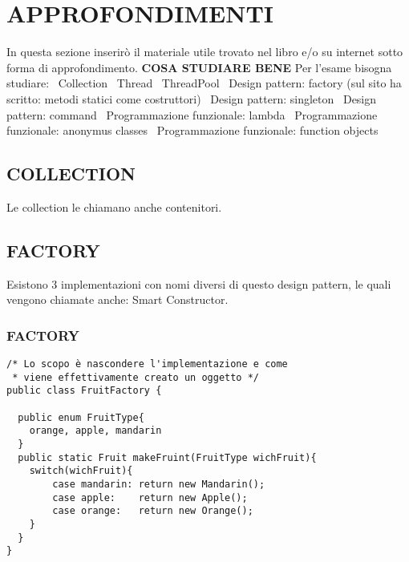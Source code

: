 

\newpage
\section{APPROFONDIMENTI}
In questa sezione inserirò il materiale utile trovato nel libro e/o su internet sotto forma di approfondimento. \newline
\noindent \textbf{COSA STUDIARE BENE} \newline
Per l'esame bisogna studiare: \newline
\textbullet\ Collection \newline
\textbullet\ Thread \newline
\textbullet\ ThreadPool \newline
\textbullet\ Design pattern: factory (sul sito ha scritto: metodi statici come costruttori)\newline
\textbullet\ Design pattern: singleton \newline
\textbullet\ Design pattern: command \newline
\textbullet\ Programmazione funzionale: lambda \newline
\textbullet\ Programmazione funzionale: anonymus classes \newline
\textbullet\ Programmazione funzionale: function objects \newline

\subsection{COLLECTION}
\noindent Le collection le chiamano anche contenitori.

\subsection{FACTORY}
Esistono 3 implementazioni con nomi diversi di questo design pattern, le quali vengono chiamate anche: Smart Constructor. \newline
\subsubsection{FACTORY}
\begin{lstlisting}
/* Lo scopo è nascondere l'implementazione e come
 * viene effettivamente creato un oggetto */
public class FruitFactory {

  public enum FruitType{
  	orange, apple, mandarin
  }
  public static Fruit makeFruint(FruitType wichFruit){
  	switch(wichFruit){
  		case mandarin: return new Mandarin();
  		case apple:    return new Apple();
  		case orange:   return new Orange();
  	}
  }
}
\end{lstlisting}

